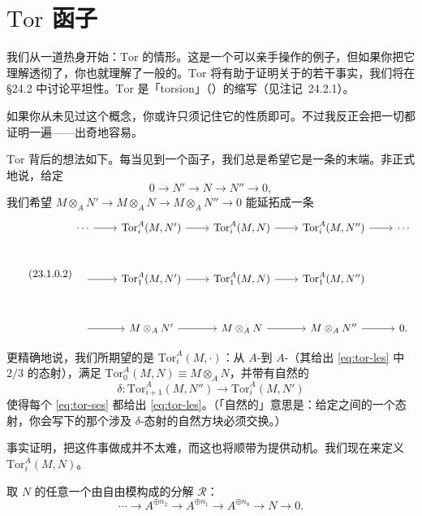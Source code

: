 
\section{$\mathrm{Tor}$ 函子}

我们从一道热身开始：$\mathrm{Tor}$ 的情形。这是一个可以亲手操作的例子，但如果你把它理解透彻了，你也就理解了一般的\trDerivedFunctor。$\mathrm{Tor}$ 将有助于证明关于\trFlatness{}的若干事实，我们将在 \S24.2 中讨论平坦性。$\mathrm{Tor}$ 是「torsion」（\trTorsion）的缩写（见\mbox{注记~24.2.1}）。

如果你从未见过这个概念，你或许只须记住它的性质即可。不过我反正会把一切都证明一遍——出奇地容易。

$\mathrm{Tor}$ 背后的想法如下。每当见到一个\trRightExact{}函子，我们总是希望它是一条\trLongExactSequence{}的末端。非正式地说，给定\trShortExactSequence
\[
\tag{23.1.0.1}\label{eq:tor-ses}
0 \longrightarrow N' \longrightarrow N \longrightarrow N'' \longrightarrow 0,
\]
我们希望 $M\otimes_A N' \to M\otimes_A N \to M\otimes_A N'' \to 0$ 能延拓成一条\trLongExactSequence
\begin{equation*}\tag{23.1.0.2}\label{eq:tor-les}
\begin{tikzcd}[row sep=2.9em, column sep=2.2em]
\cdots \ar[r] & \mathrm{Tor}^A_i(M,N') \ar[r] & \mathrm{Tor}^A_i(M,N) \ar[r] & \mathrm{Tor}^A_i(M,N'') \ar[r] & \cdots \\
 \ar[r] & \mathrm{Tor}^A_1(M,N') \ar[r] & \mathrm{Tor}^A_1(M,N) \ar[r] & \mathrm{Tor}^A_1(M,N'') & \\
 \ar[r] & M\otimes_A N' \ar[r] & M\otimes_A N \ar[r] & M\otimes_A N'' \ar[r] & 0.
\end{tikzcd}
\end{equation*}

更精确地说，我们所期望的是\emph{\trCovariantFunctor}{} $\mathrm{Tor}^A_i(M,\cdot)$：从 $A$-\trModule{}到 $A$-\trModule{}（其\trFunctoriality{}给出 \eqref{eq:tor-les} 中 $2/3$ 的态射），满足 $\mathrm{Tor}^A_0(M,N)\equiv M\otimes_A N$，并带有自然的\emph{\trConnectingHomomorphism}
\[
\delta\colon \mathrm{Tor}^A_{i+1}(M,N'') \longrightarrow \mathrm{Tor}^A_i(M,N')
\]
使得每个\trShortExactSequence{} \eqref{eq:tor-ses} 都给出\trLongExactSequence{} \eqref{eq:tor-les}。（「自然的」意思是：给定\trShortExactSequence{}之间的一个态射，你会写下的那个涉及 $\delta$-态射的自然方块必须交换。）

事实证明，把这件事做成并不太难，而这也将顺带为\trDerivedFunctor{}提供动机。我们现在来定义 $\mathrm{Tor}^A_i(M,N)$。

取 $N$ 的任意一个由自由模构成的分解 $\mathscr{R}$：
\[
\cdots \longrightarrow A^{\oplus n_2} \longrightarrow A^{\oplus n_1} \longrightarrow A^{\oplus n_0} \longrightarrow N \longrightarrow 0.
\]


